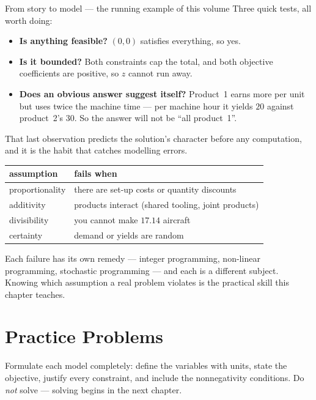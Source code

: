 \begin{worked}{From story to model --- the running example of this volume}
Three quick tests, all worth doing:
\begin{itemize}[leftmargin=1.6em,itemsep=0.2ex]
  \item \textbf{Is anything feasible?} $(0,0)$ satisfies everything, so yes.
  \item \textbf{Is it bounded?} Both constraints cap the total, and both
        objective coefficients are positive, so $z$ cannot run away.
  \item \textbf{Does an obvious answer suggest itself?} Product~1 earns
        more per unit but uses twice the machine time --- per machine hour
        it yields $20$ against product~2's $30$. So the answer will not be
        ``all product~1''.
\end{itemize}
That last observation predicts the solution's character before any
computation, and it is the habit that catches modelling errors.

\begin{center}\footnotesize
\begin{tabular}{ll}
  \hline
  assumption & fails when\\
  \hline
  proportionality & there are set-up costs or quantity discounts\\
  additivity & products interact (shared tooling, joint products)\\
  divisibility & you cannot make $17.14$ aircraft\\
  certainty & demand or yields are random\\
  \hline
\end{tabular}
\end{center}
Each failure has its own remedy --- integer programming, non-linear
programming, stochastic programming --- and each is a different subject.
Knowing which assumption a real problem violates is the practical skill this
chapter teaches.
\end{worked}

\section{Practice Problems}

Formulate each model completely: define the variables with units, state the
objective, justify every constraint, and include the nonnegativity
conditions. Do \emph{not} solve — solving begins in the next chapter.

